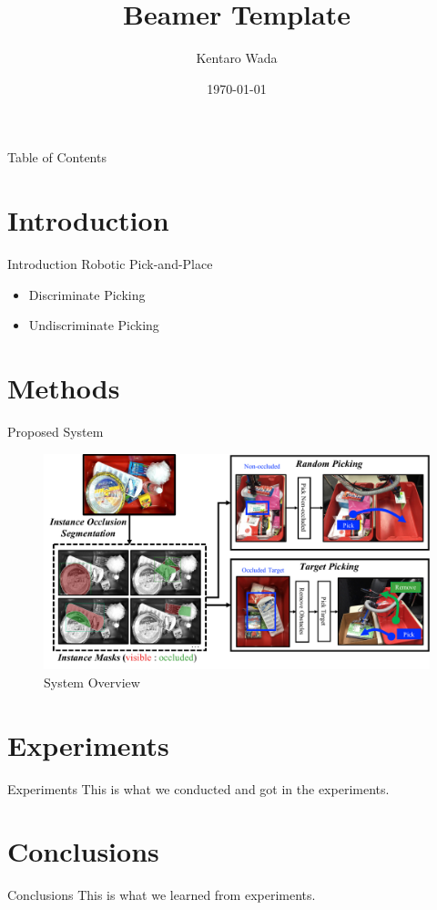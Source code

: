 \documentclass{beamer}
\title[Short Title]{Beamer Template}
\author{Kentaro Wada}
\institute{Imperial College London}
\date{\today}
\begin{document}
\begin{frame}
  \titlepage
\end{frame}

\begin{frame}{Table of Contents}
  \tableofcontents
\end{frame}

\section{Introduction}
\begin{frame}{Introduction}
  Robotic Pick-and-Place
  \begin{itemize}
    \item Discriminate Picking
    \item Undiscriminate Picking
  \end{itemize}
\end{frame}

\section{Methods}
\begin{frame}{Proposed System}
  \begin{figure}
    \includegraphics[width=\linewidth]{figs/overview.pdf}
    \caption{System Overview}
  \end{figure}
\end{frame}

\section{Experiments}
\begin{frame}{Experiments}
  This is what we conducted and got in the experiments.
\end{frame}

\section{Conclusions}
\begin{frame}{Conclusions}
  This is what we learned from experiments.
\end{frame}
\end{document}
